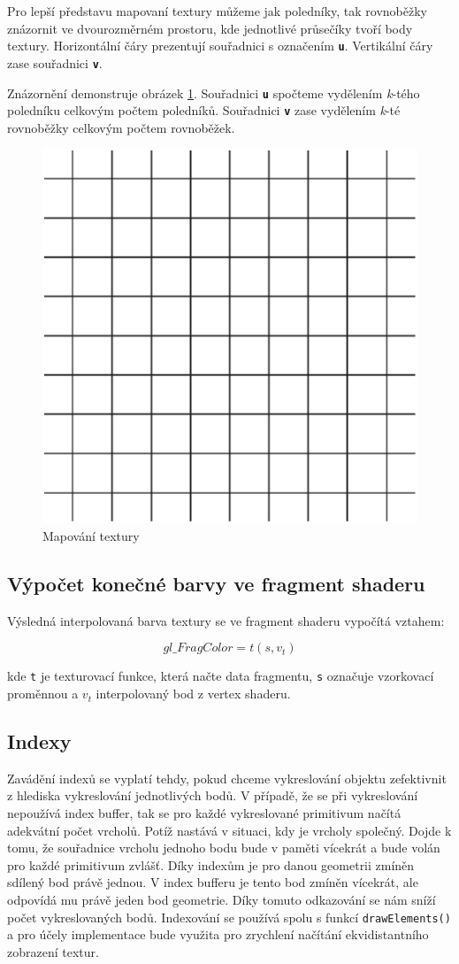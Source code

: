 \newpage

Pro lepší představu mapovaní textury můžeme jak poledníky, tak rovnoběžky znázornit ve dvourozměrném prostoru, kde jednotlivé průsečíky tvoří body textury. Horizontální čáry prezentují souřadnici s označením \texttt{\textbf{u}}. Vertikální čáry zase souřadnici \texttt{\textbf{v}}. 

Znázornění demonstruje obrázek \ref{img:grid}. Souřadnici \texttt{\textbf{u}} spočteme vydělením \textit{k}-tého poledníku celkovým počtem poledníků. Souřadnici \texttt{\textbf{v}} zase vydělením \textit{k}-té rovnoběžky celkovým počtem rovnoběžek.

\begin{figure}[h]
	\label{img:grid}
	\centering
	\includegraphics[scale=1.0,angle=0,width=0.35\linewidth]{obrazky-figures/grid}
	\caption{Mapování textury}
\end{figure}

\subsection*{Výpočet konečné barvy ve fragment shaderu}
Výsledná interpolovaná barva textury se ve fragment shaderu vypočítá vztahem:

$$ gl\_FragColor = t(s, v_{t}) $$ 

kde \texttt{t} je texturovací funkce, která načte data fragmentu, \texttt{s} označuje vzorkovací proměnnou a $v_{t}$ interpolovaný bod z vertex shaderu.


\subsection{Indexy}
Zavádění indexů se vyplatí tehdy, pokud chceme vykreslování objektu zefektivnit z hlediska vykreslování jednotlivých bodů. V případě, že se při vykreslování nepoužívá index buffer, tak se pro každé vykreslované primitivum načítá adekvátní počet vrcholů. Potíž nastává v situaci, kdy je vrcholy společný. Dojde k tomu, že souřadnice vrcholu jednoho bodu bude v paměti vícekrát a bude volán pro každé primitivum zvlášť. Díky indexům je pro danou geometrii zmíněn sdílený bod právě jednou. V index bufferu je tento bod zmíněn vícekrát, ale odpovídá mu právě jeden bod geometrie. Díky tomuto odkazování se nám sníží počet vykreslovaných bodů. Indexování se používá spolu s funkcí \texttt{drawElements()} a pro účely implementace bude využita pro zrychlení načítání ekvidistantního zobrazení textur.

